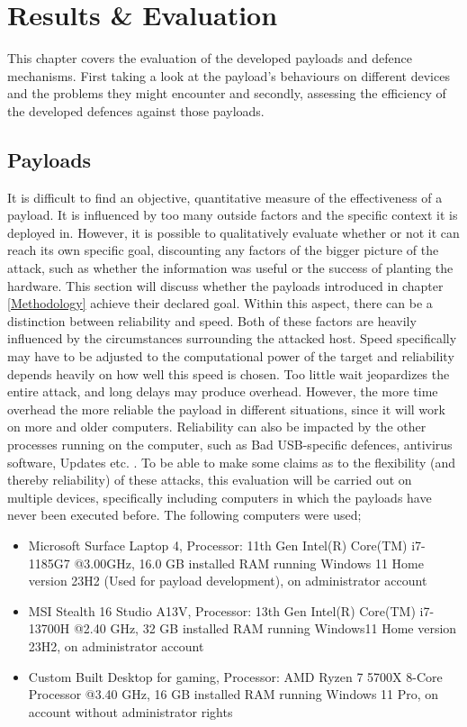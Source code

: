 \chapter{Results \& Evaluation} \label{Evaluation}

This chapter covers the evaluation of the developed payloads and defence mechanisms. First taking a look at the payload's behaviours on different devices and the problems they might encounter and secondly, assessing the efficiency of the developed defences against those payloads.


\section{Payloads}

It is difficult to find an objective, quantitative measure of the effectiveness of a payload. It is influenced by too many outside factors and the specific context it is deployed in. However, it is possible to qualitatively evaluate whether or not it can reach its own specific goal, discounting any factors of the bigger picture of the attack, such as whether the information was useful or the success of planting the hardware. This section will discuss whether the payloads introduced in chapter \ref{Methodology} achieve their declared goal. Within this aspect, there can be a distinction between reliability and speed. Both of these factors are heavily influenced by the circumstances surrounding the attacked host. Speed specifically may have to be adjusted to the computational power of the target and reliability depends heavily on how well this speed is chosen. Too little wait jeopardizes the entire attack, and long delays may produce overhead. However, the more time overhead the more reliable the payload in different situations, since it will work on more and older computers. Reliability can also be impacted by the other processes running on the computer, such as Bad USB-specific defences, antivirus software, Updates etc. . To be able to make some claims as to the flexibility (and thereby reliability) of these attacks, this evaluation will be carried out on multiple devices, specifically including computers in which the payloads have never been executed before. The following computers were used;

\begin{itemize}
    \item Microsoft Surface Laptop 4, Processor: 11th Gen Intel(R) Core(TM) i7-1185G7 @3.00GHz, 16.0 GB installed RAM running Windows 11 Home version 23H2 (Used for payload development), on administrator account
    \item MSI Stealth 16 Studio A13V, Processor: 13th Gen Intel(R) Core(TM) i7-13700H @2.40 GHz, 32 GB installed RAM running Windows11 Home version 23H2, on administrator account
    \item Custom Built Desktop for gaming, Processor: AMD Ryzen 7 5700X 8-Core Processor @3.40 GHz, 16 GB installed RAM running Windows 11 Pro, on account without administrator rights
\end{itemize}
    
